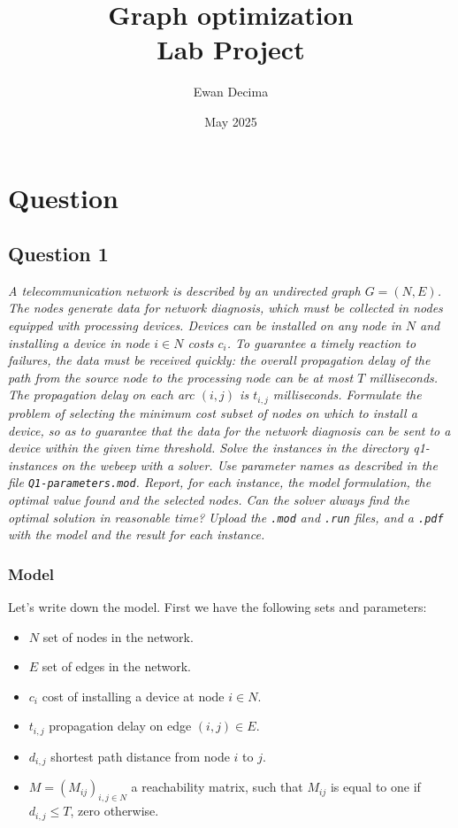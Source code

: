 \documentclass[10pt]{article}
\title{Graph optimization \\ Lab Project}
\author{Ewan Decima}
\date{May 2025}
\begin{document}
    \maketitle

    \section{Question}

    \subsection*{Question 1}
    \textit{A telecommunication network is described by an undirected graph $G=(N,E)$. The nodes generate data for network diagnosis, which must be collected in nodes equipped with processing devices. Devices can be installed on any node in $N$ and installing a device in node $i \in N$ costs $c_i$. To guarantee a timely reaction to failures, the data must be received quickly: the overall propagation delay of the path from the source node to the processing node can be at most $T$ milliseconds. The propagation delay on each arc $(i,j)$ is $t_{i,j}$ milliseconds. Formulate the problem of selecting the minimum cost subset of nodes on which to install a device, so as to guarantee that the data for the network diagnosis can be sent to a device within the given time threshold.
    Solve the instances in the directory q1-instances on the webeep with a solver. Use parameter names as described in the file \texttt{Q1-parameters.mod}.
    Report, for each instance, the model formulation, the optimal value found and the selected nodes. Can the solver always find the optimal solution in reasonable time? Upload the \texttt{.mod} and \texttt{.run} files, and a \texttt{.pdf} with the model and the result for each instance.}

    \vspace{1 cm}

    \subsubsection{Model}
    Let's write down the model. First we have the following sets and parameters:
    \begin{itemize}
        \item $N$ set of nodes in the network.
        \item $E$ set of edges in the network.
        \item $c_i$ cost of installing a device at node $i \in N$.
        \item $t_{i,j}$ propagation delay on edge $(i,j) \in E$.
        \item $d_{i,j}$ shortest path distance from node $i$ to $j$.
        \item $M = (M_{ij})_{i,j \in N}$ a reachability matrix, such that $M_{ij}$ is equal to one if $d_{i,j} \le T$, zero otherwise.
    \end{itemize}
\end{document}
